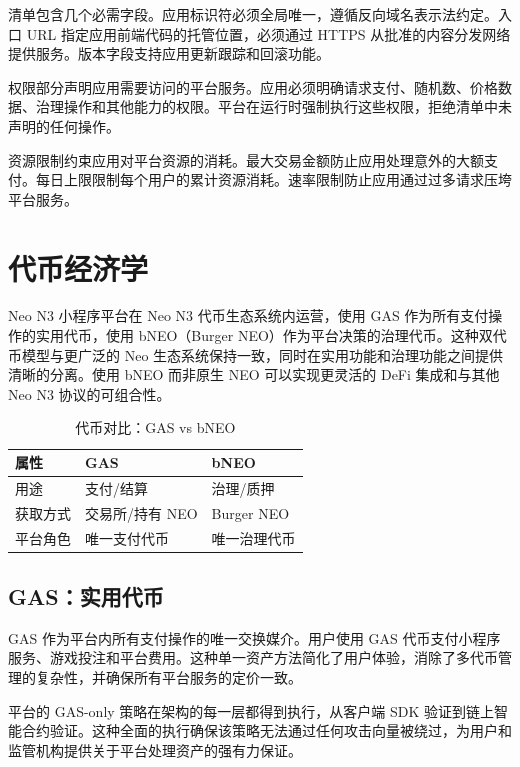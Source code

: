 \documentclass[11pt,a4paper]{article}
\begin{document}
清单包含几个必需字段。应用标识符必须全局唯一，遵循反向域名表示法约定。入口 URL 指定应用前端代码的托管位置，必须通过 HTTPS 从批准的内容分发网络提供服务。版本字段支持应用更新跟踪和回滚功能。

权限部分声明应用需要访问的平台服务。应用必须明确请求支付、随机数、价格数据、治理操作和其他能力的权限。平台在运行时强制执行这些权限，拒绝清单中未声明的任何操作。

资源限制约束应用对平台资源的消耗。最大交易金额防止应用处理意外的大额支付。每日上限限制每个用户的累计资源消耗。速率限制防止应用通过过多请求压垮平台服务。

\section{代币经济学}

Neo N3 小程序平台在 Neo N3 代币生态系统内运营，使用 GAS 作为所有支付操作的实用代币，使用 bNEO（Burger NEO）作为平台决策的治理代币。这种双代币模型与更广泛的 Neo 生态系统保持一致，同时在实用功能和治理功能之间提供清晰的分离。使用 bNEO 而非原生 NEO 可以实现更灵活的 DeFi 集成和与其他 Neo N3 协议的可组合性。

\begin{table}[h]
\centering
\caption{代币对比：GAS vs bNEO}
\begin{tabular}{@{}lll@{}}
\toprule
\textbf{属性} & \textbf{GAS} & \textbf{bNEO} \\
\midrule
用途 & 支付/结算 & 治理/质押 \\
获取方式 & 交易所/持有 NEO & Burger NEO \\
平台角色 & 唯一支付代币 & 唯一治理代币 \\
\bottomrule
\end{tabular}
\label{tab:token-comparison}
\end{table}

\subsection{GAS：实用代币}

GAS 作为平台内所有支付操作的唯一交换媒介。用户使用 GAS 代币支付小程序服务、游戏投注和平台费用。这种单一资产方法简化了用户体验，消除了多代币管理的复杂性，并确保所有平台服务的定价一致。

平台的 GAS-only 策略在架构的每一层都得到执行，从客户端 SDK 验证到链上智能合约验证。这种全面的执行确保该策略无法通过任何攻击向量被绕过，为用户和监管机构提供关于平台处理资产的强有力保证。
\end{document}

